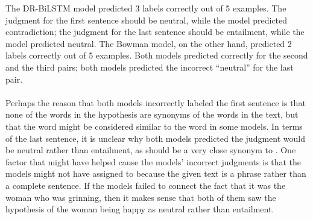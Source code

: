\documentclass[12pt,letterpaper]{article}
\begin{document}
The DR-BiLSTM model predicted 3 labels correctly out of 5 examples. The judgment for the first sentence should be neutral, while the model predicted contradiction; the judgment for the last sentence should be entailment, while the model predicted neutral. The Bowman model, on the other hand, predicted 2 labels correctly out of 5 examples. Both models predicted correctly for the second and the third pairs; both models predicted the incorrect “neutral” for the last pair. \\
\\
Perhaps the reason that both models incorrectly labeled the first sentence is that none of the words in the hypothesis are synonyms of the words in the text, but that the word  might be considered similar to the word  in some models. In terms of the last sentence, it is unclear why both models predicted the judgment would be neutral rather than entailment, as  should be a very close synonym to . One factor that might have helped cause the models' incorrect judgments is that the models might not have assigned  to  because the given text is a phrase rather than a complete sentence. If the models failed to connect the fact that it was the woman who was grinning, then it makes sense that both of them saw the hypothesis of the woman being happy as neutral rather than entailment.
\end{document}

